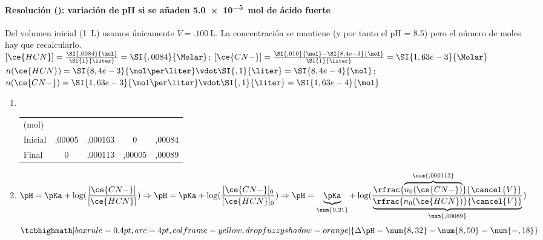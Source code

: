 \begin{frame}
	\frametitle{\ejerciciocmd}
	\framesubtitle{Resolución (): variación de pH si se añaden \SI{5,0e-5}{\mol} de ácido fuerte}
	Del volumen inicial (\SI{1}{\liter}) usamos únicamente $V=\SI{,100}{\liter}$. La concentración se mantiene (y por tanto el pH = \num{8,5}) pero el número de moles hay que recalcularlo.
	\\
	$[\ce{HCN}] = \frac{\SI{,0084}{\mol}}{\SI{1}{\liter}} = \SI{,0084}{\Molar}$;
	\quad$[\ce{CN-}] = \frac{\SI{,010}{\mol}-\SI{8,4e-3}{\mol}}{\SI{1}{\liter}} = \SI{1,63e-3}{\Molar}$
	 \\
	$n(\ce{HCN}) = \SI{8,4e-3}{\mol\per\liter}\vdot\SI{,1}{\liter} = \SI{8,4e-4}{\mol}$;
	\quad$n(\ce{CN-}) = \SI{1,63e-3}{\mol\per\liter}\vdot\SI{,1}{\liter} = \SI{1,63e-4}{\mol}$
	\begin{enumerate}[label={Paso \arabic*},font=\bfseries]
		\item{}
			\begin{center}
				\\[.15cm]
				\begin{tabular}{lSSSS}
					\toprule
						(mol) 	& {} 	& {} 	& {} 	& {} 	\\
						Inicial &  ,00005		& ,000163			& 0 	 		& ,00084 	\\
						Final	&  0			& ,000113			& ,00005 		& ,00089	\\
					\bottomrule
				\end{tabular}
			\end{center}
		\item{} 
		$$
			\pH = \pKa + \log(\frac{[\ce{CN-}]}{[\ce{HCN}]})\Rightarrow
			\pH = \pKa + \log(\frac{[\ce{CN-}]_0}{[\ce{HCN}]_0})\Rightarrow
			\pH = \underbrace{\pKa}_{\num{9,21}} +
			\log(\frac{\rfrac{\overbrace{n_0(\ce{CN-})}^{\num{,000113}}}{\cancel{V}}}{\underbrace{\rfrac{n_0(\ce{HCN})}{\cancel{V}}}_{\num{,00089}}})
		$$
		$$
			\tcbhighmath[boxrule=0.4pt,arc=4pt,colframe=yellow,drop fuzzy shadow=orange]{\Delta \pH = \num{8,32} - \num{8,50} = \num{-,18}}
		$$
	\end{enumerate}
\end{frame}

